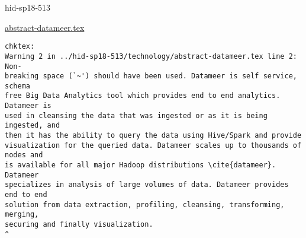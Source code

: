 

\begin{IU}

hid-sp18-513

\href{https://github.com/cloudmesh-community/hid-sp18-513/blob/master//technology/abstract-datameer.tex}{abstract-datameer.tex}

\begin{tiny}
\begin{verbatim}
chktex:
Warning 2 in ../hid-sp18-513/technology/abstract-datameer.tex line 2: Non-
breaking space (`~') should have been used. Datameer is self service, schema
free Big Data Analytics tool which provides end to end analytics. Datameer is
used in cleansing the data that was ingested or as it is being ingested, and
then it has the ability to query the data using Hive/Spark and provide
visualization for the queried data. Datameer scales up to thousands of nodes and
is available for all major Hadoop distributions \cite{datameer}. Datameer
specializes in analysis of large volumes of data. Datameer provides end to end
solution from data extraction, profiling, cleansing, transforming, merging,
securing and finally visualization.
^
\end{verbatim}
\end{tiny}
\end{IU}



